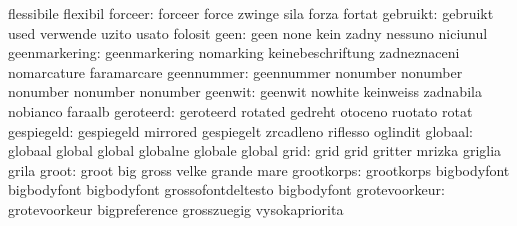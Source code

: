                            flessibile                flexibil
                  forceer: forceer                   force
                           zwinge                    sila
                           forza                     fortat
                 gebruikt: gebruikt                  used
                           verwende                  uzito
                           usato                     folosit
                     geen: geen                      none
                           kein                      zadny
                           nessuno                   niciunul
            geenmarkering: geenmarkering             nomarking
                           keinebeschriftung         zadneznaceni
                           nomarcature               faramarcare
               geennummer: geennummer                nonumber
                           nonumber                  nonumber
                           nonumber                  nonumber %
                  geenwit: geenwit                   nowhite
                           keinweiss                 zadnabila
                           nobianco                  faraalb
                geroteerd: geroteerd                 rotated
                           gedreht                   otoceno
                           ruotato                   rotat
               gespiegeld: gespiegeld                mirrored
                           gespiegelt                zrcadleno
                           riflesso                  oglindit
                  globaal: globaal                   global
                           global                    globalne
                           globale                   global
                     grid: grid                      grid
                           gritter                   mrizka
                           griglia                   grila
                    groot: groot                     big
                           gross                     velke
                           grande                    mare
               grootkorps: grootkorps                bigbodyfont
                           bigbodyfont               bigbodyfont
                           grossofontdeltesto        bigbodyfont %
            grotevoorkeur: grotevoorkeur             bigpreference
                           grosszuegig               vysokapriorita
